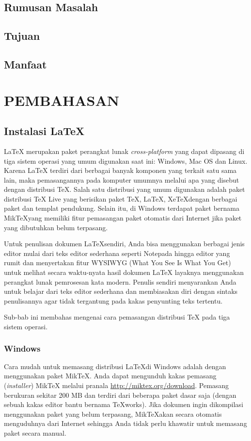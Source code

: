 \documentclass{ta-its}
\begin{document}
            
        \section{Rumusan Masalah}
        \section{Tujuan}
        \section{Manfaat}
    
    \chapter{PEMBAHASAN}
        \section{Instalasi \LaTeX{}}
        \LaTeX{} merupakan paket perangkat lunak \emph{cross-platform} yang dapat dipasang di tiga sistem operasi yang umum digunakan saat ini: Windows, Mac OS dan Linux. Karena \LaTeX{} terdiri dari berbagai banyak komponen yang terkait satu sama lain, maka pemasangannya pada komputer umumnya melalui apa yang disebut dengan distribusi \TeX{}. Salah satu distribusi yang umum digunakan adalah paket distribusi \TeX{} Live yang berisikan paket \TeX, \LaTeX, Xe\TeX dengan berbagai paket dan templat pendukung. Selain itu, di Windows terdapat paket bernama Mik\TeX yang memiliki fitur pemasangan paket otomatis dari Internet jika paket yang dibutuhkan belum terpasang.

        Untuk penulisan dokumen \LaTeX sendiri, Anda bisa menggunakan berbagai jenis editor mulai dari teks editor sederhana seperti Notepada hingga editor yang rumit dan menyertakan fitur WYSIWYG (What You See Is What You Get) untuk melihat secara waktu-nyata hasil dokumen \LaTeX{} layaknya menggunakan perangkat lunak pemrosesan kata modern. Penulis sendiri menyarankan Anda untuk belajar dari teks editor sederhana dan membiasakan diri dengan sintaks penulisannya agar tidak tergantung pada kakas penyunting teks tertentu.

        Sub-bab ini membahas mengenai cara pemasangan distribusi \TeX{} pada tiga sistem operasi. 

        \subsection{Windows}
        Cara mudah untuk memasang distribusi \LaTeX di Windows adalah dengan menggunakan paket Mik\TeX{}. Anda dapat mengunduh kakas pemasang (\emph{installer}) Mik\TeX{} melalui pranala \url{http://miktex.org/download}.  Pemasang berukuran sekitar 200 MB dan terdiri dari beberapa paket dasar saja (dengan sebuah kakas editor bantu bernama \TeX{}works). Jika dokumen ingin dikompilasi menggunakan paket yang belum terpasang, Mik\TeX akan secara otomatis menguduhnya dari Internet sehingga Anda tidak perlu khawatir untuk memasang paket secara manual.
        
\end{document}
